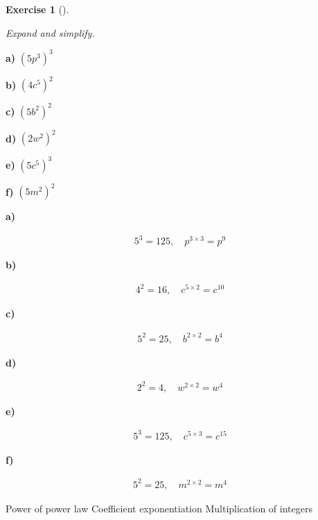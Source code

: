 \documentclass[
  letterpaper,
  DIV=11,
  numbers=noendperiod]{scrreprt}
\theoremstyle{definition}
\newtheorem{exercise}{Exercise}[chapter]
\theoremstyle{remark}
\begin{document}
\begin{exercise}[]\protect\hypertarget{exr-u2-9}{}\label{exr-u2-9}

\emph{Expand and simplify.}

\textbf{a)} \(\displaystyle (5p^{3})^{3}\)

\textbf{b)} \(\displaystyle (4c^{5})^{2}\)

\textbf{c)} \(\displaystyle (5b^{2})^{2}\)

\textbf{d)} \(\displaystyle (2w^{2})^{2}\)

\textbf{e)} \(\displaystyle (5c^{5})^{3}\)

\textbf{f)} \(\displaystyle (5m^{2})^{2}\)

\begin{tcolorbox}[enhanced jigsaw, opacitybacktitle=0.6, coltitle=black, arc=.35mm, colframe=quarto-callout-tip-color-frame, colback=white, bottomrule=.15mm, left=2mm, colbacktitle=quarto-callout-tip-color!10!white, titlerule=0mm, opacityback=0, title=\textcolor{quarto-callout-tip-color}{\faLightbulb}\hspace{0.5em}{🔍 View Solutions}, leftrule=.75mm, breakable, rightrule=.15mm, bottomtitle=1mm, toptitle=1mm, toprule=.15mm]

\textbf{a)}

\[
\begin{aligned}
5^{3}=125,\quad p^{3\times 3}=p^{9}
\end{aligned}
\]

\textbf{b)}

\[
\begin{aligned}
4^{2}=16,\quad c^{5\times 2}=c^{10}
\end{aligned}
\]

\textbf{c)}

\[
\begin{aligned}
5^{2}=25,\quad b^{2\times 2}=b^{4}
\end{aligned}
\]

\textbf{d)}

\[
\begin{aligned}
2^{2}=4,\quad w^{2\times 2}=w^{4}
\end{aligned}
\]

\textbf{e)}

\[
\begin{aligned}
5^{3}=125,\quad c^{5\times 3}=c^{15}
\end{aligned}
\]

\textbf{f)}

\[
\begin{aligned}
5^{2}=25,\quad m^{2\times 2}=m^{4}
\end{aligned}
\]

\end{tcolorbox}

{Power of power law} {Coefficient exponentiation} {Multiplication of
integers}

\end{exercise}
\end{document}
